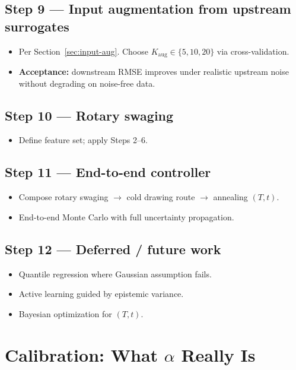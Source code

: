 \documentclass[11pt,a4paper]{article}
\begin{document}
\subsection*{Step 9 --- Input augmentation from upstream surrogates}
\begin{itemize}
    \item Per Section~\ref{sec:input-aug}. Choose $K_{\text{aug}} \in \{5, 10, 20\}$ via cross-validation.
    \item \textbf{Acceptance:} downstream RMSE improves under realistic upstream noise without degrading on noise-free data.
\end{itemize}

\subsection*{Step 10 --- Rotary swaging}
\begin{itemize}
    \item Define feature set; apply Steps 2--6.
\end{itemize}

\subsection*{Step 11 --- End-to-end controller}
\begin{itemize}
    \item Compose rotary swaging $\to$ cold drawing route $\to$ annealing $(T, t)$.
    \item End-to-end Monte Carlo with full uncertainty propagation.
\end{itemize}

\subsection*{Step 12 --- Deferred / future work}
\begin{itemize}
    \item Quantile regression where Gaussian assumption fails.
    \item Active learning guided by epistemic variance.
    \item Bayesian optimization for $(T,t)$.
\end{itemize}

\section{Calibration: What \texorpdfstring{$\alpha$}{alpha} Really Is}
\label{sec:calibration-explained}
\end{document}
